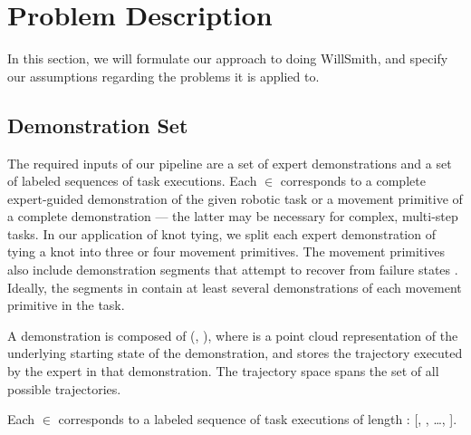 \section{Problem Description}
\label{sec:formulation}
%

In this section, we will formulate our approach to doing WillSmith, and
specify our assumptions regarding the problems it is applied to.

\subsection{Demonstration Set}

The required inputs of our pipeline are a set \demoset{}
of expert demonstrations and a set  of labeled sequences of
task executions.
Each \demovar{} $\in$ \demoset{} corresponds to a complete expert-guided
demonstration of the given robotic task or a movement primitive of a complete
demonstration --- the latter may be necessary for complex, multi-step tasks.
In our application of knot tying, we split each expert demonstration of
tying a knot into three or four movement primitives. The movement primitives
also include demonstration segments that attempt to
recover from failure states \cite{Schulmanetal_ISRR2013}.
Ideally, the segments in \demoset{} contain at least several demonstrations
of each movement primitive in the task.

A demonstration \demovar{} is composed of (, ),
where  is a point cloud representation of the underlying
starting state of the demonstration, and  stores
the trajectory executed by the expert in that demonstration. The trajectory
space \trajset{} spans the set of all possible trajectories.

Each  $\in$  corresponds to a labeled sequence of
task executions of length : [, , \ldots,
]. 


